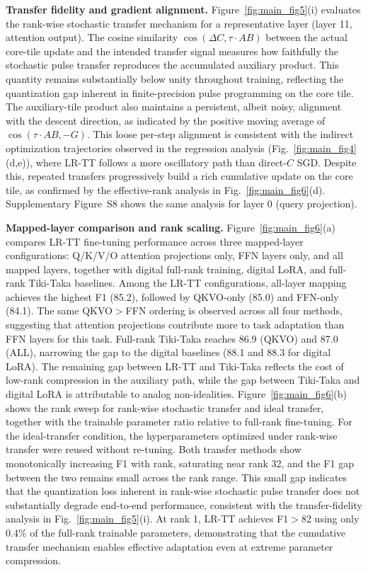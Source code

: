 \documentclass[AMA,LATO2COL]{WileyNJDv5}
\newcommand{\new}[1]{{\color{red}#1}}
\begin{document}
\noindent
\new{\textbf{Transfer fidelity and gradient alignment.}
Figure~\ref{fig:main_fig5}(i) evaluates the rank-wise stochastic transfer mechanism for a representative layer (layer 11, attention output). The cosine similarity \(\cos(\Delta C, \tau\cdot AB)\) between the actual core-tile update and the intended transfer signal measures how faithfully the stochastic pulse transfer reproduces the accumulated auxiliary product. This quantity remains substantially below unity throughout training, reflecting the quantization gap inherent in finite-precision pulse programming on the core tile. The auxiliary-tile product also maintains a persistent, albeit noisy, alignment with the descent direction, as indicated by the positive moving average of \(\cos(\tau\cdot AB, -G)\). This loose per-step alignment is consistent with the indirect optimization trajectories observed in the regression analysis (Fig.~\ref{fig:main_fig4}(d,e)), where LR-TT follows a more oscillatory path than direct-\(C\) SGD. Despite this, repeated transfers progressively build a rich cumulative update on the core tile, as confirmed by the effective-rank analysis in Fig.~\ref{fig:main_fig6}(d). Supplementary Figure~S8 shows the same analysis for layer 0 (query projection).}

\noindent
\new{\textbf{Mapped-layer comparison and rank scaling.}
Figure~\ref{fig:main_fig6}(a) compares LR-TT fine-tuning performance across three mapped-layer configurations: Q/K/V/O attention projections only, FFN layers only, and all mapped layers, together with digital full-rank training, digital LoRA, and full-rank Tiki-Taka baselines. Among the LR-TT configurations, all-layer mapping achieves the highest F1 (85.2), followed by QKVO-only (85.0) and FFN-only (84.1). The same QKVO\(>\)FFN ordering is observed across all four methods, suggesting that attention projections contribute more to task adaptation than FFN layers for this task. Full-rank Tiki-Taka reaches 86.9 (QKVO) and 87.0 (ALL), narrowing the gap to the digital baselines (88.1 and 88.3 for digital LoRA). The remaining gap between LR-TT and Tiki-Taka reflects the cost of low-rank compression in the auxiliary path, while the gap between Tiki-Taka and digital LoRA is attributable to analog non-idealities. Figure~\ref{fig:main_fig6}(b) shows the rank sweep for rank-wise stochastic transfer and ideal transfer, together with the trainable parameter ratio relative to full-rank fine-tuning. For the ideal-transfer condition, the hyperparameters optimized under rank-wise transfer were reused without re-tuning. Both transfer methods show monotonically increasing F1 with rank, saturating near rank 32, and the F1 gap between the two remains small across the rank range. This small gap indicates that the quantization loss inherent in rank-wise stochastic pulse transfer does not substantially degrade end-to-end performance, consistent with the transfer-fidelity analysis in Fig.~\ref{fig:main_fig5}(i). At rank 1, LR-TT achieves F1\(>\)82 using only 0.4\% of the full-rank trainable parameters, demonstrating that the cumulative transfer mechanism enables effective adaptation even at extreme parameter compression.}
\end{document}
